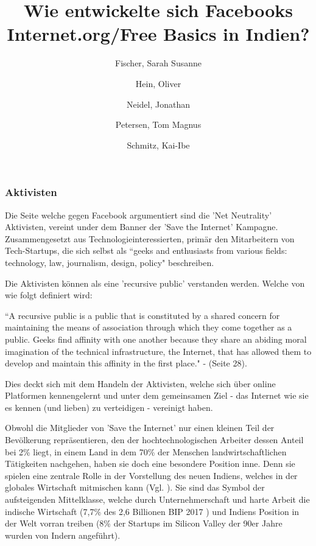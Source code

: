 \documentclass{article}
\title{Wie entwickelte sich Facebooks Internet.org/Free Basics in Indien?}
\author{
  Fischer, Sarah Susanne\\
  \and
  Hein, Oliver\\
  \and
  Neidel, Jonathan\\
  \and
  Petersen, Tom Magnus\\
  \and
  Schmitz, Kai-Ibe\\
}
\begin{document}
\maketitle

\subsubsection{Aktivisten}


Die Seite welche gegen Facebook argumentiert sind die 'Net Neutrality' Aktivisten, vereint under dem Banner der 'Save the Internet' Kampagne.
Zusammengesetzt aus Technologieinteressierten, primär den Mitarbeitern von Tech-Startups, die sich selbst als ``geeks and enthusiasts from various fields: technology, law, journalism, design, policy" \cite{sti2015} beschreiben.

\medskip

Die Aktivisten können als eine 'recursive public' verstanden werden. Welche von \textcite{twoBits} wie folgt definiert wird:

\medskip

``A recursive public is a public that is constituted by a shared concern for maintaining the means of association through which they come together as a public.
Geeks find affinity with one another because they share an abiding moral imagination of the technical infrastructure, the Internet, that has allowed them to develop and maintain this affinity in the first place." - \textcite{twoBits} (Seite 28).

\medskip

Dies deckt sich mit dem Handeln der Aktivisten, welche sich über online Platformen kennengelernt und unter dem gemeinsamen Ziel - das Internet wie sie es kennen (und lieben) zu verteidigen - vereinigt haben.

\medskip

Obwohl die Mitglieder von 'Save the Internet' nur einen kleinen Teil der Bevölkerung repräsentieren, den der hochtechnologischen Arbeiter dessen Anteil bei 2\% liegt, in einem Land in dem 70\% der Menschen landwirtschaftlichen Tätigkeiten nachgehen, haben sie doch eine besondere Position inne. Denn sie spielen eine zentrale Rolle in der Vorstellung des neuen Indiens, welches in der globales Wirtschaft mitmischen kann (Vgl. \cite{thomas2012}).
Sie sind das Symbol der aufsteigenden Mittelklasse, welche durch Unternehmerschaft und harte Arbeit die indische Wirtschaft (7,7\% des 2,6 Billionen BIP 2017 \cite{statistaIndiaGDP}\cite{imfIndiaGDP}) und Indiens Position in der Welt vorran treiben (8\% der Startups im Silicon Valley der 90er Jahre wurden von Indern angeführt\cite{upadhya2004}).
\end{document}
